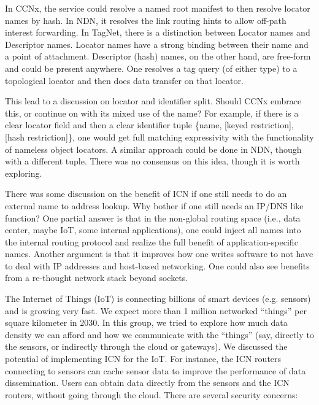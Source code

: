 \documentclass[a4paper,UKenglish]{dagrep}
\begin{document}
In CCNx, the service could resolve a named root manifest to then resolve locator names by hash. 
In NDN, it resolves the link routing hints to allow off-path interest forwarding. In TagNet, 
there is a distinction between Locator names and Descriptor names. Locator names have a 
strong binding between their name and a point of attachment. Descriptor (hash) names, on the 
other hand, are free-form and could be present anywhere.  One resolves a tag query (of either 
type) to a topological locator and then does data transfer on that locator.
 
This lead to a discussion on locator and identifier split.  Should CCNx embrace this, or continue on with its mixed use of the name? For example, if there is a clear locator field and then a clear identifier tuple \{name, [keyed restriction], [hash restriction]\}, one would get full matching expressivity with the functionality of nameless object locators.  A similar approach could be done in NDN, though with a different tuple.  There was no consensus on this idea, though it is worth exploring.
 
There was some discussion on the benefit of ICN if one still needs to do an external name to address lookup.  Why bother if one still needs an IP/DNS like function?  One partial answer is that in the non-global routing space (i.e., data center, maybe IoT, some internal applications), one could inject all names into the internal routing protocol and realize the full benefit of application-specific names.  Another argument is that it improves how one writes software to not have to deal with IP addresses and host-based networking.   One could also see benefits from a re-thought network stack beyond sockets.

\license

The Internet of Things (IoT) is connecting billions of smart devices (e.g. sensors) and is growing very fast. We expect more than 1 million networked ``things'' per square kilometer in 2030. In this group, we tried to explore how much data density we can afford 
and how we communicate with the ``things'' (say, directly to the sensors, or indirectly through the cloud or gateways). We discussed the potential of implementing ICN for the IoT. For instance, the ICN routers connecting to sensors can cache sensor data to improve the performance of data dissemination. Users can obtain data directly from the sensors and the ICN routers, without going through the cloud. There are several security concerns:
\end{document}
